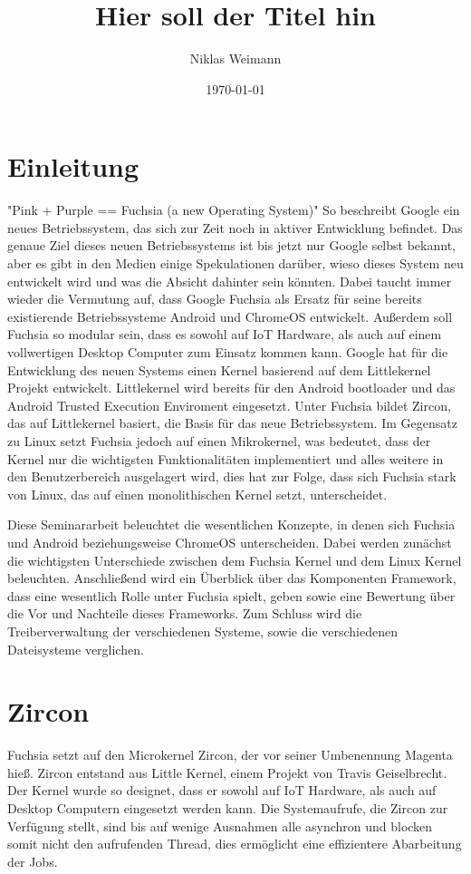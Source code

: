 \documentclass[a4paper]{scrartcl}
\begin{document}
\title{Hier soll der Titel hin}
\author{Niklas Weimann}
\date{\today}

\maketitle


\tableofcontents
\newpage



\section{Einleitung}
"Pink + Purple == Fuchsia (a new Operating System)"\cite{GoogleLLC.} So beschreibt Google ein neues Betriebssystem, das sich zur Zeit noch in aktiver Entwicklung befindet. Das genaue Ziel dieses neuen Betriebssystems ist bis jetzt nur Google selbst bekannt, aber es gibt in den Medien einige Spekulationen darüber, wieso dieses System neu entwickelt wird und was die Absicht dahinter sein könnten. Dabei taucht immer wieder die Vermutung auf, dass Google Fuchsia als Ersatz für seine bereits existierende Betriebssysteme Android und ChromeOS entwickelt. Außerdem soll Fuchsia so modular sein, dass es sowohl auf IoT Hardware, als auch auf einem vollwertigen Desktop Computer zum Einsatz kommen kann. Google hat für die Entwicklung des neuen Systems einen Kernel basierend auf dem Littlekernel Projekt entwickelt. Littlekernel wird bereits für den Android bootloader und das Android Trusted Execution Enviroment eingesetzt. Unter Fuchsia bildet Zircon, das auf Littlekernel basiert, die Basis für das neue Betriebssystem. Im Gegensatz zu Linux setzt Fuchsia jedoch auf einen Mikrokernel, was bedeutet, dass der Kernel nur die wichtigsten Funktionalitäten implementiert und alles weitere in den Benutzerbereich ausgelagert wird, dies hat zur Folge, dass sich Fuchsia stark von Linux, das auf einen monolithischen Kernel setzt, unterscheidet.

Diese Seminararbeit beleuchtet die wesentlichen Konzepte, in denen sich Fuchsia und Android beziehungsweise ChromeOS unterscheiden. Dabei werden zunächst die wichtigsten Unterschiede zwischen dem Fuchsia Kernel und dem Linux Kernel beleuchten. Anschließend wird ein Überblick über das Komponenten Framework, dass eine wesentlich Rolle unter Fuchsia spielt, geben sowie eine Bewertung über die Vor und Nachteile dieses Frameworks. Zum Schluss wird die Treiberverwaltung der verschiedenen Systeme, sowie die verschiedenen Dateisysteme verglichen.
\section{Zircon}
Fuchsia setzt auf den Microkernel Zircon, der vor seiner Umbenennung Magenta hieß. Zircon entstand aus Little Kernel, einem Projekt von Travis Geiselbrecht. Der Kernel wurde so designet, dass er sowohl auf IoT Hardware, als auch auf Desktop Computern eingesetzt werden kann. \cite{DaveAltavilla.30.Juni2019} Die Systemaufrufe, die Zircon zur Verfügung stellt, sind bis auf wenige Ausnahmen alle asynchron und blocken somit nicht den aufrufenden Thread, dies ermöglicht eine effizientere Abarbeitung der Jobs.
\end{document}
